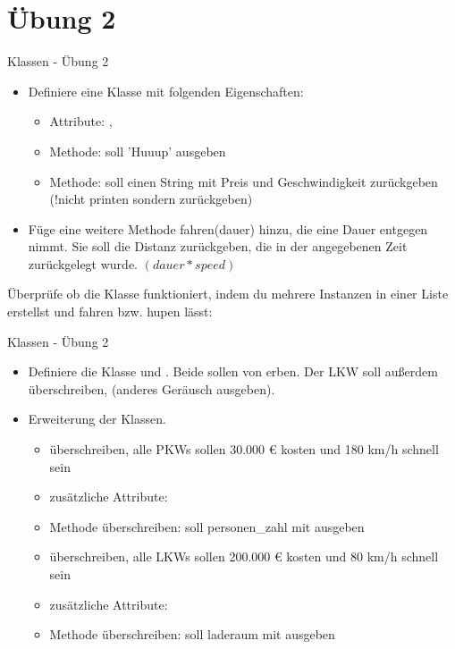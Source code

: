\section{Übung 2}
\begin{frame}{Klassen - Übung 2}
	\begin{itemize}
		\item[1.] Definiere eine Klasse  mit folgenden Eigenschaften: 
		\begin{itemize}
			\item Attribute: , 
			\item Methode:  soll 'Huuup' ausgeben
			\item Methode:  soll einen String mit Preis und Geschwindigkeit zurückgeben (!nicht printen sondern zurückgeben) 
		\end{itemize}
		
		\item[2.] Füge eine weitere Methode \alert{fahren(dauer)} hinzu, die eine \alert{Dauer} entgegen nimmt. Sie soll die Distanz zurückgeben, die in der angegebenen Zeit zurückgelegt wurde. $(dauer * speed)$
	\end{itemize}
	Überprüfe ob die Klasse funktioniert, indem du mehrere Instanzen in einer Liste erstellst und fahren bzw. hupen lässt:
	
\end{frame}


\begin{frame}{Klassen - Übung 2}
	\begin{itemize}
		\item[3.] 
		Definiere die Klasse  und . Beide sollen von  erben.
		Der LKW soll außerdem  überschreiben, (anderes Geräusch ausgeben).
		
		\item[4.] 
			Erweiterung der Klassen.\linebreak
			\begin{itemize}
				\item {} überschreiben, alle PKWs sollen 30.000 € kosten und 180 km/h schnell sein
				\item zusätzliche Attribute: 
				\item {} Methode überschreiben: soll personen\_zahl mit ausgeben
			\end{itemize}
		
			\begin{itemize}
				\item {} überschreiben, alle LKWs sollen 200.000 € kosten und 80 km/h schnell sein
				\item zusätzliche Attribute: 
				\item {} Methode überschreiben: soll laderaum mit ausgeben
			\end{itemize}
	\end{itemize}
\end{frame}


